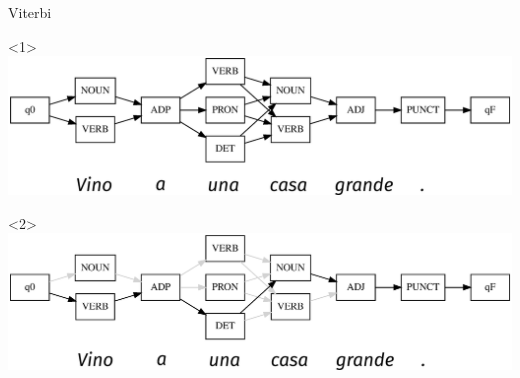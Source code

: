 \documentclass{beamer}
\begin{document}

\begin{frame}{Viterbi}

\begin{onlyenv}<1>
\includegraphics[width=\textwidth]{images/viterbi-1.eps}
\end{onlyenv}

\begin{onlyenv}<2>
\includegraphics[width=\textwidth]{images/viterbi-2.eps}
\end{onlyenv}


\end{frame}
\end{document}
